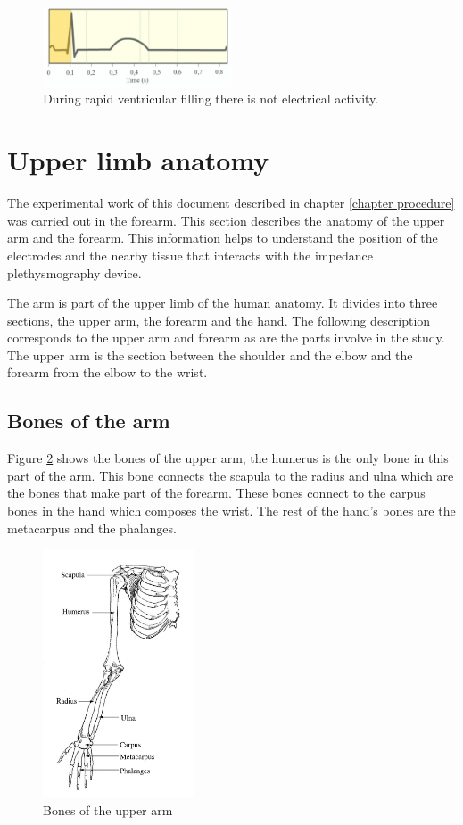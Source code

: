 \begin{figure}[!htpb]
	\centering
	\includegraphics[width=0.5\textwidth,keepaspectratio]{figure_19} 
	\caption[ECG during rapid ventricular filling]{During rapid ventricular filling there is not electrical activity.}
	\label{fig:ECG atrial systole}
\end{figure}
 
\section{Upper limb anatomy}
The experimental work of this document described in chapter \ref{chapter procedure} was carried out in the forearm. This section describes the anatomy of the upper arm and the forearm. This information helps to understand the position of the electrodes and the nearby tissue that interacts with the impedance plethysmography device. 

The arm is part of the upper limb of the human anatomy. It divides into three sections, the upper arm, the forearm and the hand. The following description corresponds to the upper arm and forearm as are the parts involve in the study. The upper arm is the section between the shoulder and the elbow and the forearm from the elbow to the wrist. 


\subsection{Bones of the arm}
Figure \ref{fig:upper limb bones} shows the bones of the upper arm, the humerus is the only bone in this part of the arm. This bone connects the scapula to the radius and ulna which are the bones that make part of the forearm. These bones connect to the carpus bones in the hand which composes the wrist. The rest of the hand's bones are the metacarpus and the phalanges. 

\begin{figure}[!htpb]
	\centering
	\includegraphics[width=0.4\textwidth,keepaspectratio]{figure_20} 
	\caption{Bones of the upper arm}
	\label{fig:upper limb bones}
\end{figure}


